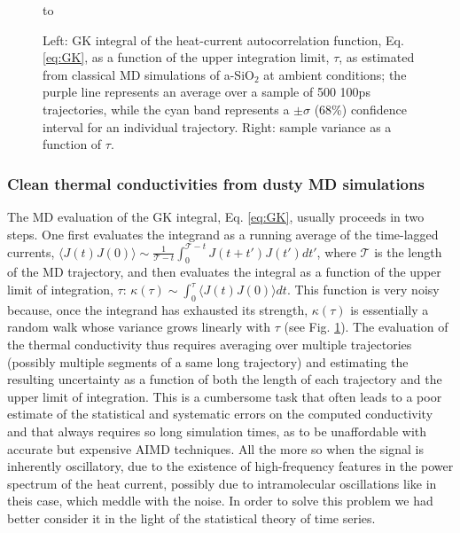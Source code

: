 \begin{figure}
\hbox to \caption{Left: GK integral of the heat-current autocorrelation function, Eq. \eqref{eq:GK}, as a function of the upper integration limit, $\tau$, as estimated from classical MD simulations of a-SiO$_2$ at ambient conditions; the purple line represents an average over a sample of 500 100ps trajectories, while the cyan band represents a $\pm\sigma$ (68\%) confidence interval for an individual trajectory. Right: sample variance as a function of $\tau$.}
\label{fig:kappa-H2O}
\vspace{-5mm}
\end{figure}

\subsubsection*{Clean thermal conductivities from dusty MD simulations}
The MD evaluation of the GK integral, Eq. \eqref{eq:GK}, usually proceeds in two steps. One first evaluates the integrand as a running average of the time-lagged currents, $\langle J(t)J(0)\rangle \sim \frac{1}{\mathcal{T}-t}\int_0^{\mathcal{T}-t}J(t+t')J(t')dt'$, where $\mathcal{T}$ is the length of the MD trajectory, and then evaluates the integral as a function of the upper limit of integration, $\tau$: $\kappa(\tau)\sim \int_0^\tau\langle J(t)J(0)\rangle dt$. This function is very noisy because, once the integrand has exhausted its strength, $\kappa(\tau)$ is essentially a random walk whose variance grows linearly with $\tau$ (see Fig. \ref{fig:kappa-H2O}). The evaluation of the thermal conductivity thus requires averaging over multiple trajectories (possibly multiple segments of a same long trajectory) and estimating the resulting uncertainty as a function of both the length of each trajectory and the upper limit of integration. This is a cumbersome task that often leads to a poor estimate of the statistical and systematic errors on the computed conductivity and that always requires so long simulation times,\cite{Schelling2002,Nevins2007,Jones2012,Zhang2015,Oliveira2017} as to be unaffordable with accurate but expensive AIMD techniques.\cite{Carbogno:2017gc} All the more so when the signal is inherently oscillatory, due to the existence of high-frequency features in the power spectrum of the heat current, possibly due to intramolecular oscillations like in theis case, which meddle with the noise. In order to solve this problem we had better consider it in the light of the statistical theory of time series.


